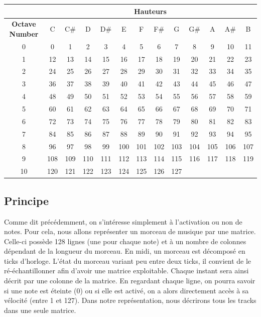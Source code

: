 \begin{tiny}
\begin{center}
\begin{tabular}{|c|c|c|c|c|c|c|c|c|c|c|c|c|}
\hline
 & \multicolumn{12}{c|}{\textbf{Hauteurs}} \\
\hline
\textbf{Octave Number} & C & C\# & D & D\# & E & F & F\# & G & G\# & A & A\# & B  \\
\hline
0 & 0 & 1 & 2 & 3 & 4 & 5 & 6 & 7 & 8 & 9 & 10 & 11  \\
\hline
1 & 12 & 13 & 14 & 15 & 16 & 17 & 18 & 19 & 20 & 21 & 22 & 23  \\
\hline
2 & 24 & 25 & 26 & 27 & 28 & 29 & 30 & 31 & 32 & 33 & 34 & 35  \\
\hline
3 & 36 & 37 & 38 & 39 & 40 & 41 & 42 & 43 & 44 & 45 & 46 & 47  \\
\hline
4 & 48 & 49 & 50 & 51 & 52 & 53 & 54 & 55 & 56 & 57 & 58 & 59  \\
\hline
5 & 60 & 61 & 62 & 63 & 64 & 65 & 66 & 67 & 68 & 69 & 70 & 71  \\
\hline
6 & 72 & 73 & 74 & 75 & 76 & 77 & 78 & 79 & 80 & 81 & 82 & 83  \\
\hline
7 & 84 & 85 & 86 & 87 & 88 & 89 & 90 & 91 & 92 & 93 & 94 & 95  \\
\hline
8 & 96 & 97 & 98 & 99 & 100 & 101 & 102 & 103 & 104 & 105 & 106 & 107  \\
\hline
9 & 108 & 109 & 110 & 111 & 112 & 113 & 114 & 115 & 116 & 117 & 118 & 119  \\
\hline
10 & 120 & 121 & 122 & 123 & 124 & 125 & 126 & 127 &   &   &   & \\
\hline
\end{tabular}
\label{tableau_notes}
\end{center}
\end{tiny}

\subsection{Principe}
Comme dit précédemment, on s'intéresse simplement à l'activation ou non de notes. Pour cela, nous allons représenter un morceau de musique par une matrice. Celle-ci possède 128 lignes (une pour chaque note) et à un nombre de colonnes dépendant de la longueur du morceau. En midi, un morceau est décomposé en ticks d'horloge. L'état du morceau variant peu entre deux ticks, il convient de le ré-échantillonner afin d'avoir une matrice exploitable. Chaque instant sera ainsi décrit par une colonne de la matrice. En regardant chaque ligne, on pourra savoir si une note est éteinte (0) ou si elle est activé, on a alors directement accès à sa vélocité (entre 1 et 127). Dans notre représentation, nous décrirons tous les tracks dans une seule matrice.

